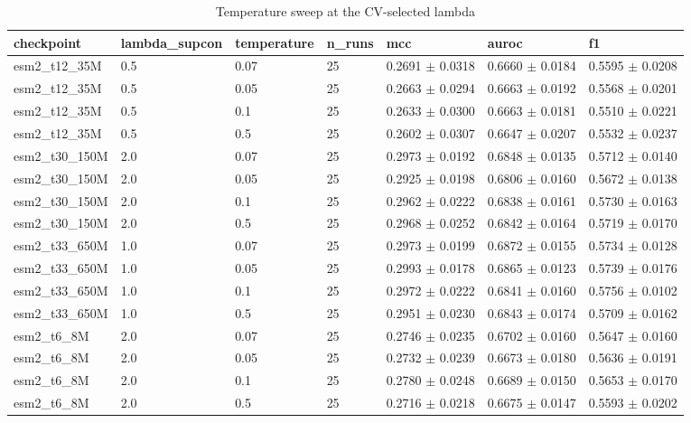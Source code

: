 \begin{table}[ht]
\centering\small
\caption{Temperature sweep at the CV-selected lambda}
\label{tab:T5_5b_temperature_sweep}
\begin{tabular}{lllllll}
\hline
checkpoint & lambda\_supcon & temperature & n\_runs & mcc & auroc & f1 \\
\hline
esm2\_t12\_35M & 0.5 & 0.07 & 25 & 0.2691 $\pm$ 0.0318 & 0.6660 $\pm$ 0.0184 & 0.5595 $\pm$ 0.0208 \\
esm2\_t12\_35M & 0.5 & 0.05 & 25 & 0.2663 $\pm$ 0.0294 & 0.6663 $\pm$ 0.0192 & 0.5568 $\pm$ 0.0201 \\
esm2\_t12\_35M & 0.5 & 0.1 & 25 & 0.2633 $\pm$ 0.0300 & 0.6663 $\pm$ 0.0181 & 0.5510 $\pm$ 0.0221 \\
esm2\_t12\_35M & 0.5 & 0.5 & 25 & 0.2602 $\pm$ 0.0307 & 0.6647 $\pm$ 0.0207 & 0.5532 $\pm$ 0.0237 \\
esm2\_t30\_150M & 2.0 & 0.07 & 25 & 0.2973 $\pm$ 0.0192 & 0.6848 $\pm$ 0.0135 & 0.5712 $\pm$ 0.0140 \\
esm2\_t30\_150M & 2.0 & 0.05 & 25 & 0.2925 $\pm$ 0.0198 & 0.6806 $\pm$ 0.0160 & 0.5672 $\pm$ 0.0138 \\
esm2\_t30\_150M & 2.0 & 0.1 & 25 & 0.2962 $\pm$ 0.0222 & 0.6838 $\pm$ 0.0161 & 0.5730 $\pm$ 0.0163 \\
esm2\_t30\_150M & 2.0 & 0.5 & 25 & 0.2968 $\pm$ 0.0252 & 0.6842 $\pm$ 0.0164 & 0.5719 $\pm$ 0.0170 \\
esm2\_t33\_650M & 1.0 & 0.07 & 25 & 0.2973 $\pm$ 0.0199 & 0.6872 $\pm$ 0.0155 & 0.5734 $\pm$ 0.0128 \\
esm2\_t33\_650M & 1.0 & 0.05 & 25 & 0.2993 $\pm$ 0.0178 & 0.6865 $\pm$ 0.0123 & 0.5739 $\pm$ 0.0176 \\
esm2\_t33\_650M & 1.0 & 0.1 & 25 & 0.2972 $\pm$ 0.0222 & 0.6841 $\pm$ 0.0160 & 0.5756 $\pm$ 0.0102 \\
esm2\_t33\_650M & 1.0 & 0.5 & 25 & 0.2951 $\pm$ 0.0230 & 0.6843 $\pm$ 0.0174 & 0.5709 $\pm$ 0.0162 \\
esm2\_t6\_8M & 2.0 & 0.07 & 25 & 0.2746 $\pm$ 0.0235 & 0.6702 $\pm$ 0.0160 & 0.5647 $\pm$ 0.0160 \\
esm2\_t6\_8M & 2.0 & 0.05 & 25 & 0.2732 $\pm$ 0.0239 & 0.6673 $\pm$ 0.0180 & 0.5636 $\pm$ 0.0191 \\
esm2\_t6\_8M & 2.0 & 0.1 & 25 & 0.2780 $\pm$ 0.0248 & 0.6689 $\pm$ 0.0150 & 0.5653 $\pm$ 0.0170 \\
esm2\_t6\_8M & 2.0 & 0.5 & 25 & 0.2716 $\pm$ 0.0218 & 0.6675 $\pm$ 0.0147 & 0.5593 $\pm$ 0.0202 \\
\hline
\end{tabular}
\end{table}
